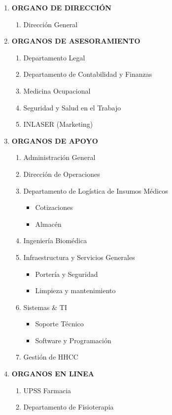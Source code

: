 \begin{enumerate}
	\item \textbf{ORGANO DE DIRECCIÓN}
	\begin{enumerate}
		\item Dirección General
	\end{enumerate}
	\item \textbf{ORGANOS DE ASESORAMIENTO}
	\begin{enumerate}
		\item Departamento Legal
		\item Departamento de Contabilidad y Finanzas
		\item Medicina Ocupacional
		\item Seguridad y Salud en el Trabajo
		\item INLASER (Marketing) 
	\end{enumerate}
	\item \textbf{ORGANOS DE APOYO}
	\begin{enumerate}
		\item Administración General
		\item Dirección de Operaciones
		\item Departamento de Logística de Insumos Médicos
		\begin{itemize}
			\item Cotizaciones
			\item Almacén 
		\end{itemize}
		\item Ingeniería Biomédica
		\item Infraestructura y Servicios Generales
		\begin{itemize}
			\item Portería y Seguridad
			\item Limpieza y mantenimiento 
		\end{itemize}
		\item Sistemas $\&$ TI
		\begin{itemize}
			\item Soporte Técnico
			\item Software y Programación 
		\end{itemize}
		\item Gestión de HHCC
	\end{enumerate}
	\item \textbf{ORGANOS EN LINEA}
	\begin{enumerate}
	 	\item UPSS Farmacia
	 	\item Departamento de Fisioterapia

\end{enumerate}
\end{enumerate}
